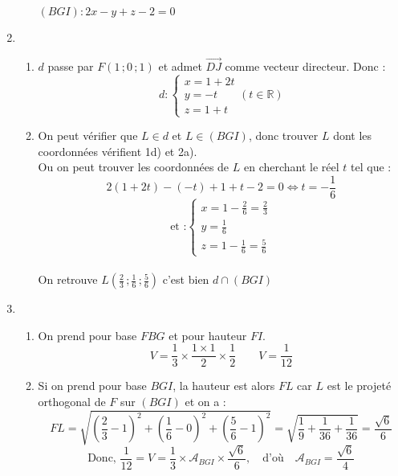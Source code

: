 \documentclass{scrartcl}
\begin{document}
\begin{adjustwidth}{2em}{0pt}
\begin{enumerate}
\begin{enumerate}[label=\alph*)]
                $\boxed{(BGI):2x-y+z-2=0}$ 
            \end{enumerate}
            \item \begin{enumerate}[label=\alph*)]
                \item   $d$ passe par $F(1\,;0\,;1)$ et admet $\overrightarrow{DJ}$ comme vecteur directeur. Donc : \[\boxed{d:\begin{cases}
                    x=1+2t \\ y=-t \\ z=1+t
                \end{cases} (t\in{\mathbb{R}})}\]
                \item On peut vérifier que $L\in d$ et $L\in(BGI)$, donc trouver $L$ dont les coordonnées vérifient 1d) et 2a). \\ Ou on peut trouver les coordonnées de $L$ en cherchant le réel $t$ tel que : \[2(1+2t)-(-t)+1+t-2=0\iff t=-\frac{1}{6}\]  \[\text{et :}\begin{cases}
                    x=1-\frac{2}{6}=\frac{2}{3} \\ y=\frac{1}{6} \\ z=1-\frac{1}{6}=\frac{5}{6}
                \end{cases}\] \\
                On retrouve $\boxed{L\left(\frac{2}{3}\,;\frac{1}{6}\,;\frac{5}{6}\right)}$ c'est bien $d\cap(BGI)$
            \end{enumerate}
            \item \begin{enumerate}[label=\alph*)]
                \item On prend pour base $FBG$ et pour hauteur $FI$. \[V=\frac{1}{3}\times\frac{1\times 1}{2}\times\frac{1}{2}\qquad\boxed{V=\frac{1}{12}}\]
                \item Si on prend pour base $BGI$, la hauteur est alors $FL$ car $L$ est le projeté orthogonal de $F$ sur $(BGI)$ et on a : \[FL=\sqrt{\left(\frac{2}{3}-1\right)^2+\left(\frac{1}{6}-0\right)^2+\left(\frac{5}{6}-1\right)^2}=\sqrt{\frac{1}{9}+\frac{1}{36}+\frac{1}{36}}=\frac{\sqrt{6}}{6}\] \[\text{Donc, }\frac{1}{12}=V=\frac{1}{3}\times\mathcal{A}_{BGI}\times\frac{\sqrt{6}}{6},\quad\text{d'où}\quad\boxed{\mathcal{A}_{BGI}=\frac{\sqrt{6}}{4}}\]
            \end{enumerate}
        \end{enumerate}
    \end{adjustwidth}
\end{document}
